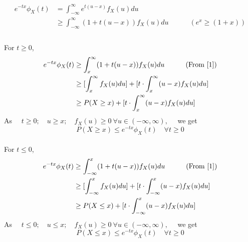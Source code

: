 \documentclass[11pt, fleqn]{article}
\begin{document}
\begin{equation}
    \label{1}
    \begin{split}
        e^{-tx} \phi_X(t) &= \int_{-\infty}^{\infty} e^{t(u-x)} f_X(u) du \\
            &\ge \int_{-\infty}^{\infty} (1 + t(u-x)) f_X(u) du \hspace{3em} (e^x \ge (1 + x)) \\
    \end{split}
\end{equation}
\\
For $t \ge 0$,
\begin{equation}
    \begin{split}
        e^{-tx} \phi_X(t) &\ge \int_{x}^{\infty} (1 + t(u-x)) f_X(u) du \hspace{3em} (\text{From \ref{1}}) \\
            &\ge [\int_{x}^{\infty} f_X(u) du] + [t \cdot \int_{x}^{\infty} (u-x) f_X(u) du] \\
            &\ge P(X \ge x) + [t \cdot \int_{x}^{\infty} (u-x) f_X(u) du]
    \end{split}
\end{equation}
As $\quad t \ge 0;\quad u \ge x; \quad f_X(u) \ge 0 \  \forall u\in(-\infty, \infty), \quad$ we get
\begin{equation}
    \label{3}
    P(X \ge x) \le e^{-tx} \phi_X(t) \quad \forall t \ge 0
\end{equation}
\\
For $t \le 0$,
\begin{equation}
    \begin{split}
        e^{-tx} \phi_X(t) &\ge \int_{-\infty}^{x} (1 + t(u-x)) f_X(u) du \hspace{3em} (\text{From \ref{1}}) \\
            &\ge [\int_{-\infty}^{x} f_X(u) du] + [t \cdot \int_{-\infty}^{x} (u-x) f_X(u) du] \\
            &\ge P(X \le x) + [t \cdot \int_{-\infty}^{x} (u-x) f_X(u) du]
    \end{split}
\end{equation}
As $\quad t \le 0;\quad u \le x; \quad f_X(u) \ge 0 \  \forall u\in(-\infty, \infty), \quad$ we get
\begin{equation}
    P(X \le x) \le e^{-tx} \phi_X(t) \quad \forall t \ge 0
\end{equation}
\end{document}
